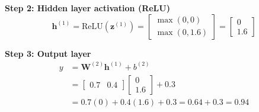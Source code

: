 \begin{examplebox}
\textbf{Step 2: Hidden layer activation (ReLU)}
\begin{equation}
\mathbf{h}^{(1)} = \text{ReLU}(\mathbf{z}^{(1)}) = \begin{bmatrix} \max(0, 0) \\ \max(0, 1.6) \end{bmatrix} = \begin{bmatrix} 0 \\ 1.6 \end{bmatrix}
\end{equation}

\textbf{Step 3: Output layer}
\begin{align}
y &= \mathbf{W}^{(2)}\mathbf{h}^{(1)} + b^{(2)} \\
&= \begin{bmatrix} 0.7 & 0.4 \end{bmatrix} \begin{bmatrix} 0 \\ 1.6 \end{bmatrix} + 0.3 \\
&= 0.7(0) + 0.4(1.6) + 0.3 = 0.64 + 0.3 = \boxed{0.94}
\end{align}
\end{examplebox}

